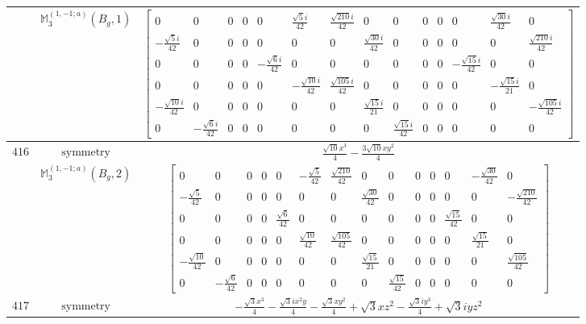 \documentclass[fleqn,8pt,landscape]{jsarticle}
\begin{document}
\begin{longtable}{ccc}
$  $ & $ \mathbb{M}_{3}^{(1,-1;a)}(B_{g},1) $ & $ \begin{bmatrix} 0 & 0 & 0 & 0 & 0 & \frac{\sqrt{5} i}{42} & \frac{\sqrt{210} i}{42} & 0 & 0 & 0 & 0 & 0 & \frac{\sqrt{30} i}{42} & 0 \\ - \frac{\sqrt{5} i}{42} & 0 & 0 & 0 & 0 & 0 & 0 & \frac{\sqrt{30} i}{42} & 0 & 0 & 0 & 0 & 0 & \frac{\sqrt{210} i}{42} \\ 0 & 0 & 0 & 0 & - \frac{\sqrt{6} i}{42} & 0 & 0 & 0 & 0 & 0 & 0 & - \frac{\sqrt{15} i}{42} & 0 & 0 \\ 0 & 0 & 0 & 0 & 0 & - \frac{\sqrt{10} i}{42} & \frac{\sqrt{105} i}{42} & 0 & 0 & 0 & 0 & 0 & - \frac{\sqrt{15} i}{21} & 0 \\ - \frac{\sqrt{10} i}{42} & 0 & 0 & 0 & 0 & 0 & 0 & \frac{\sqrt{15} i}{21} & 0 & 0 & 0 & 0 & 0 & - \frac{\sqrt{105} i}{42} \\ 0 & - \frac{\sqrt{6} i}{42} & 0 & 0 & 0 & 0 & 0 & 0 & \frac{\sqrt{15} i}{42} & 0 & 0 & 0 & 0 & 0 \end{bmatrix} $ \\ \hline
$ 416 $ & $ \text{symmetry} $ & $ \frac{\sqrt{10} x^{3}}{4} - \frac{3 \sqrt{10} x y^{2}}{4} $ \\
$  $ & $ \mathbb{M}_{3}^{(1,-1;a)}(B_{g},2) $ & $ \begin{bmatrix} 0 & 0 & 0 & 0 & 0 & - \frac{\sqrt{5}}{42} & \frac{\sqrt{210}}{42} & 0 & 0 & 0 & 0 & 0 & - \frac{\sqrt{30}}{42} & 0 \\ - \frac{\sqrt{5}}{42} & 0 & 0 & 0 & 0 & 0 & 0 & \frac{\sqrt{30}}{42} & 0 & 0 & 0 & 0 & 0 & - \frac{\sqrt{210}}{42} \\ 0 & 0 & 0 & 0 & \frac{\sqrt{6}}{42} & 0 & 0 & 0 & 0 & 0 & 0 & \frac{\sqrt{15}}{42} & 0 & 0 \\ 0 & 0 & 0 & 0 & 0 & \frac{\sqrt{10}}{42} & \frac{\sqrt{105}}{42} & 0 & 0 & 0 & 0 & 0 & \frac{\sqrt{15}}{21} & 0 \\ - \frac{\sqrt{10}}{42} & 0 & 0 & 0 & 0 & 0 & 0 & \frac{\sqrt{15}}{21} & 0 & 0 & 0 & 0 & 0 & \frac{\sqrt{105}}{42} \\ 0 & - \frac{\sqrt{6}}{42} & 0 & 0 & 0 & 0 & 0 & 0 & \frac{\sqrt{15}}{42} & 0 & 0 & 0 & 0 & 0 \end{bmatrix} $ \\ \hline
$ 417 $ & $ \text{symmetry} $ & $ - \frac{\sqrt{3} x^{3}}{4} - \frac{\sqrt{3} i x^{2} y}{4} - \frac{\sqrt{3} x y^{2}}{4} + \sqrt{3} x z^{2} - \frac{\sqrt{3} i y^{3}}{4} + \sqrt{3} i y z^{2} $ \\

\end{longtable}
\end{document}
